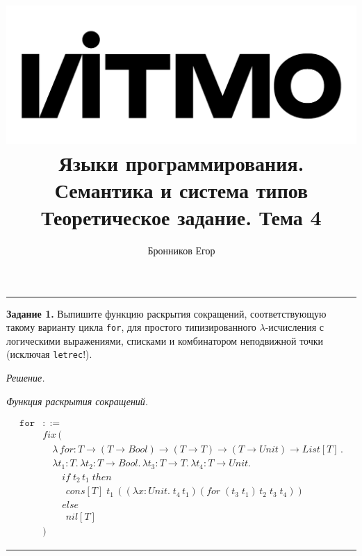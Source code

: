 \documentclass[landscape, 11pt]{report}
\title{
	\includegraphics[scale=0.07]{logo}\\
	\vspace{0.5em}
	Языки программирования. Семантика и система типов\\
	\vspace{0.2em}
	\Large Теоретическое задание. Тема 4
}
\author{Бронников Егор}
\date{}
\begin{document}
	
	
	\maketitle
	
	\vspace{-0.5cm}
	\hrule
	\vspace{0.5cm}
	
	
	\textbf{Задание 1.} Выпишите функцию раскрытия сокращений, соответствующую такому варианту цикла \verb|for|, для простого типизированного $\lambda$-исчисления с логическими выражениями, списками и комбинатором неподвижной точки (исключая \verb|letrec|!).
	
	\vspace{0.2cm}
	
	\textit{Решение.}
	
	\vspace{0.2cm}
	
	\textit{Функция раскрытия сокращений.}
	
	\vspace{-0.6cm}
	
	\begin{equation*}
		\begin{split}
			\mathtt{for} &::= \\
			& fix \, ( \\
			& \quad \lambda \, for : T \rightarrow (T \rightarrow  Bool) \rightarrow (T \rightarrow T) \rightarrow (T \rightarrow Unit) \rightarrow List[T] \, . \\
			& \quad \lambda t_1 : T . \, \lambda t_2 : T \rightarrow Bool . \, \lambda t_3 : T \rightarrow T . \, \lambda t_4 : T \rightarrow Unit . \\
			& \qquad if \; t_2 \, t_1 \; then \\
			& \hspace{1cm} cons[T] \; t_1 \, \left(\left(\lambda x : Unit . \; t_4 \, t_1 \right) \left(for \; (t_3 \; t_1) \, t_2 \; t_3 \; t_4 \right)\right) \\
			& \qquad else \\
			& \hspace{1cm} nil[T] \\
			& )
		\end{split}
	\end{equation*}

	\vspace{0.2cm}
	\hrule
	\vspace{0.5cm}
	
\end{document}
